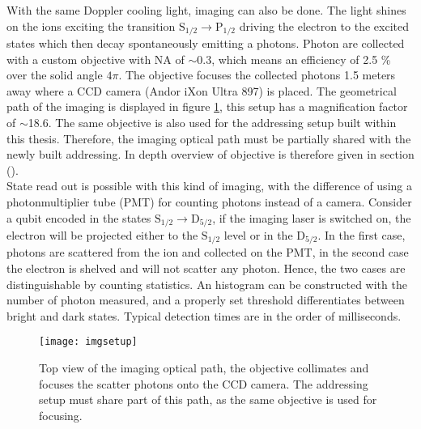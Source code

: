 With the same Doppler cooling light, imaging can also be done. The light shines on the ions exciting the transition $\text{S}_{1/2} \to \text{P}_{1/2}$ driving the electron to the excited states which then decay spontaneously emitting a photons. Photon are collected with a custom objective with NA of $\sim 0.3$, which means an efficiency of 2.5 \% over the solid angle $4\pi$. The objective focuses the collected photons 1.5 meters away where a CCD camera (Andor iXon Ultra 897) is placed. The geometrical path of the imaging is displayed in figure \ref{imgsetup}, this setup has a magnification factor of $\sim$18.6. The same objective is also used for the addressing setup built within this thesis. Therefore, the imaging optical path must be partially shared with the newly built addressing. In depth overview of objective is therefore given in section ().\\
State read out is possible with this kind of imaging, with the difference of using a photonmultiplier tube (PMT) for counting photons instead of a camera. Consider a qubit encoded in the states $\text{S}_{1/2} \to \text{D}_{5/2}$, if the imaging laser is switched on, the electron will be projected either to the $\text{S}_{1/2}$ level or in the $\text{D}_{5/2} $. In the first case, photons are scattered from the ion and collected on the PMT, in the second case the electron is shelved and will not scatter any photon. Hence, the two cases are distinguishable by counting statistics. An histogram can be constructed  with the number of photon measured, and a properly set threshold differentiates between bright and dark states. Typical detection times are in the order of milliseconds.

\begin{figure}
\centering
\texttt{[image: imgsetup]}
\caption{Top view of the imaging optical path, the objective collimates and focuses the scatter photons onto the CCD camera. The addressing setup must share part of this path, as the same objective is used for focusing.}
\label{imgsetup}
\end{figure}


